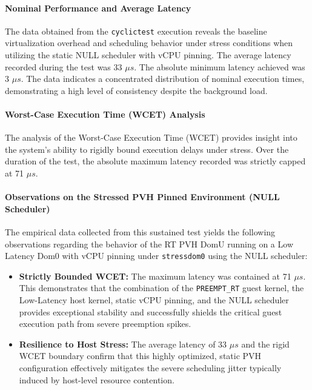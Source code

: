 \paragraph{Nominal Performance and Average
Latency}\label{nominal-performance-and-average-latency-30}

The data obtained from the \texttt{cyclictest} execution reveals the
baseline virtualization overhead and scheduling behavior under stress
conditions when utilizing the static NULL scheduler with vCPU pinning.
The average latency recorded during the test was 33 $\mu s$. The absolute
minimum latency achieved was 3 $\mu s$. The data indicates a concentrated
distribution of nominal execution times, demonstrating a high level of
consistency despite the background load.

\paragraph{Worst-Case Execution Time (WCET)
Analysis}\label{worst-case-execution-time-wcet-analysis-32}

The analysis of the Worst-Case Execution Time (WCET) provides insight
into the system's ability to rigidly bound execution delays under
stress. Over the duration of the test, the absolute maximum latency
recorded was strictly capped at 71 $\mu s$.

\paragraph{Observations on the Stressed PVH Pinned Environment (NULL
Scheduler)}\label{observations-on-the-stressed-pvh-pinned-environment-null-scheduler}

The empirical data collected from this sustained test yields the
following observations regarding the behavior of the RT PVH DomU running
on a Low Latency Dom0 with vCPU pinning under \texttt{stressdom0} using
the NULL scheduler:

\begin{itemize}
\item
  \textbf{Strictly Bounded WCET:} The maximum latency was contained at
  71 $\mu s$. This demonstrates that the combination of the
  \texttt{PREEMPT\_RT} guest kernel, the Low-Latency host kernel, static
  vCPU pinning, and the NULL scheduler provides exceptional stability
  and successfully shields the critical guest execution path from severe
  preemption spikes.
\item
  \textbf{Resilience to Host Stress:} The average latency of 33 $\mu s$ and
  the rigid WCET boundary confirm that this highly optimized, static PVH
  configuration effectively mitigates the severe scheduling jitter
  typically induced by host-level resource contention.
\end{itemize}

